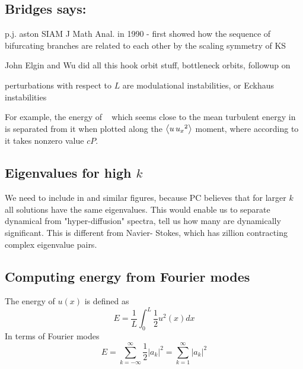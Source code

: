 \subsection*{Bridges says:}

p.j. aston SIAM J Math Anal. in 1990 - first showed how the sequence of bifurcating branches
are related to each other by the scaling symmetry of KS

John Elgin and Wu did all this hook orbit stuff, bottleneck orbits, followup on

perturbations with respect to $L$ are modulational instabilities, or Eckhaus  instabilities

For example, the energy of \reqva\  which
seems close to the
mean turbulent energy in  is separated
from it when plotted along the
$\left\langle {u \, u_{x}{}^2} \right\rangle$ moment, where according to
 it takes nonzero value $c P$.

\subsection*{Eigenvalues for high $k$}

We need to include  
in  and similar figures, because
PC believes that for larger $k$ all solutions have the same eigenvalues. This
    would enable us to separate dynamical from "hyper-diffusion" spectra,
    tell us how many are dynamically significant. This is different from Navier-
Stokes,
    which has zillion contracting complex eigenvalue pairs.

\subsection*{Computing energy from Fourier modes}
The energy of $u(x)$ is defined as
\[
   E = \frac{1}{L}\int_0^L \textstyle\frac{1}{2}u^2(x) dx
\]
In terms of Fourier modes
\[
   E = \sum_{k=-\infty}^\infty {\textstyle\frac{1}{2}}|a_k|^2 =
   \sum_{k=1}^\infty |a_k|^2
\]
